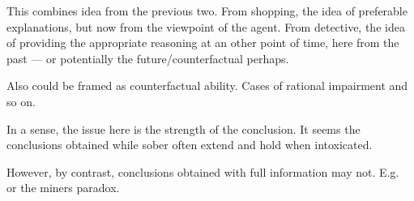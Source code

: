 \documentclass[10pt]{article}
\begin{document}
\begin{note}[Idea]
  This combines idea from the previous two.
  From shopping, the idea of preferable explanations, but now from the viewpoint of the agent.
  From detective, the idea of providing the appropriate reasoning at an other point of time, here from the past --- or potentially the future/counterfactual perhaps.
\end{note}

\begin{note}[Counterfactual]
Also could be framed as counterfactual ability.
Cases of rational impairment and so on.

In a sense, the issue here is the strength of the conclusion.
It seems the conclusions obtained while sober often extend and hold when intoxicated.

However, by contrast, conclusions obtained with full information may not.
E.g.\ \cite{Smith:2004aa} or the miners paradox.
\end{note}
\end{document}
